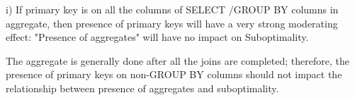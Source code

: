 i) If primary key is on all the columns of SELECT /GROUP BY columns in 
aggregate, then presence of primary keys will have a very strong 
moderating effect: "Presence of aggregates" will have no impact on 
Suboptimality. 

The aggregate is generally done after all the joins are completed; 
therefore, the presence of primary keys on non-GROUP BY columns should 
not impact the relationship between presence of aggregates and suboptimality. 

